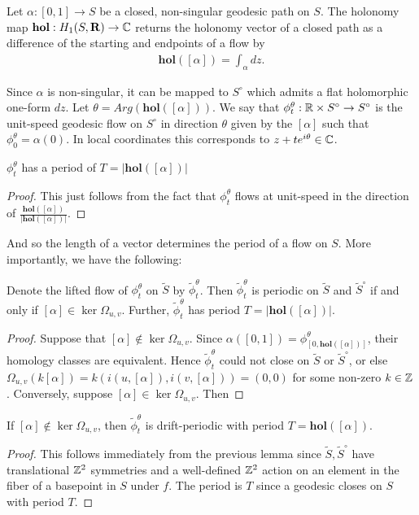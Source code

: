\documentclass[]{article}
\def\hol{\mathbf{hol}}
\begin{document}
\begin{Def}
Let $\alpha:[0,1]\rightarrow S$ be a closed, non-singular geodesic path on $S$. The holonomy map $\mathbf{hol}:H_1(S, \mathbf{R})\rightarrow\mathbb{C}$ returns the holonomy vector of a closed path as a difference of the starting and endpoints of a flow by\\
\begin{align*}
\mathbf{hol}([\alpha])=\int_{\alpha}dz.
\end{align*}
\end{Def}
Since $\alpha$ is non-singular, it can be mapped to $S^\circ$ which admits a flat holomorphic one-form $dz$. Let $\theta=Arg(\mathbf{hol}([\alpha]))$. We say that $\phi_t^\theta:\mathbb{R}\times S^\circ \rightarrow S^\circ$ is the unit-speed geodesic flow on $S^\circ$ in direction $\theta$ given by the  $[\alpha]$ such that $\phi^\theta_0=\alpha(0)$. In local coordinates this corresponds to $z+te^{i\theta}\in \mathbb{C}$.

\begin{lem}
$\phi_t^\theta$ has a period of $T=|\mathbf{hol}([\alpha])|$
\begin{proof}
This just follows from the fact that $\phi_t^\theta$ flows at unit-speed in the direction of $\frac{\mathbf{hol}([\alpha])}{|\mathbf{hol}([\alpha])|}$. 
\end{proof}
\end{lem}
And so the length of a vector determines the period of a flow on $S$. More importantly, we have the following:

\begin{lem}
Denote the lifted flow of $\phi_t^\theta$ on $\tilde{S}$ by $\tilde{\phi}_t^\theta$. Then $\tilde{\phi}_t^\theta$ is periodic on $\tilde{S}$ and $\tilde{S}^\circ$ if and only if $[\alpha]\in\ker\Omega_{u,v}$. Further, $\tilde{\phi}_t^\theta$ has period $T=|\mathbf{hol}([\alpha])|$.
\begin{proof}
Suppose that $[\alpha]\notin\ker\Omega_{u,v}$. Since $\alpha([0,1])=\phi^\theta_{[0,\hol([\alpha])]}$, their homology classes are equivalent. Hence $\tilde{\phi}_t^\theta$ could not close on $\tilde{S}$ or $\tilde{S}^\circ$, or else $\Omega_{u,v}(k[\alpha])=k(i(u,[\alpha]),i(v,[\alpha]))=(0,0)$ for some non-zero $k\in\mathbb{Z}$. Conversely, suppose $[\alpha]\in\ker\Omega_{u,v}$. Then 
\end{proof}
\end{lem}

\begin{cor}
If $[\alpha]\notin\ker\Omega_{u,v}$, then $\tilde{\phi}_t^\theta$ is drift-periodic with period $T=\hol([\alpha])$.
\begin{proof}
This follows immediately from the previous lemma since $\tilde{S},\tilde{S}^\circ$ have translational $\mathbb{Z}^2$ symmetries and a well-defined $\mathbb{Z}^2$ action on an element in the fiber of a basepoint in $S$ under $f$. The period is $T$ since a geodesic closes on $S$ with period $T$.
\end{proof}
\end{cor}
\end{document}
